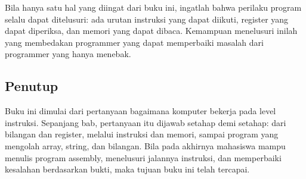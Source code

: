 \begin{infobox}
\vspace{1.1em}
Bila hanya satu hal yang diingat dari buku ini, ingatlah bahwa
perilaku program selalu dapat ditelusuri: ada urutan instruksi yang
dapat diikuti, register yang dapat diperiksa, dan memori yang dapat
dibaca. Kemampuan menelusuri inilah yang membedakan programmer yang
dapat memperbaiki masalah dari programmer yang hanya menebak.
\end{infobox}

\subsection{Penutup}

Buku ini dimulai dari pertanyaan bagaimana komputer bekerja pada
level instruksi. Sepanjang bab, pertanyaan itu dijawab setahap demi
setahap: dari bilangan dan register, melalui instruksi dan memori,
sampai program yang mengolah array, string, dan bilangan. Bila pada
akhirnya mahasiswa mampu menulis program assembly, menelusuri
jalannya instruksi, dan memperbaiki kesalahan berdasarkan bukti,
maka tujuan buku ini telah tercapai.
